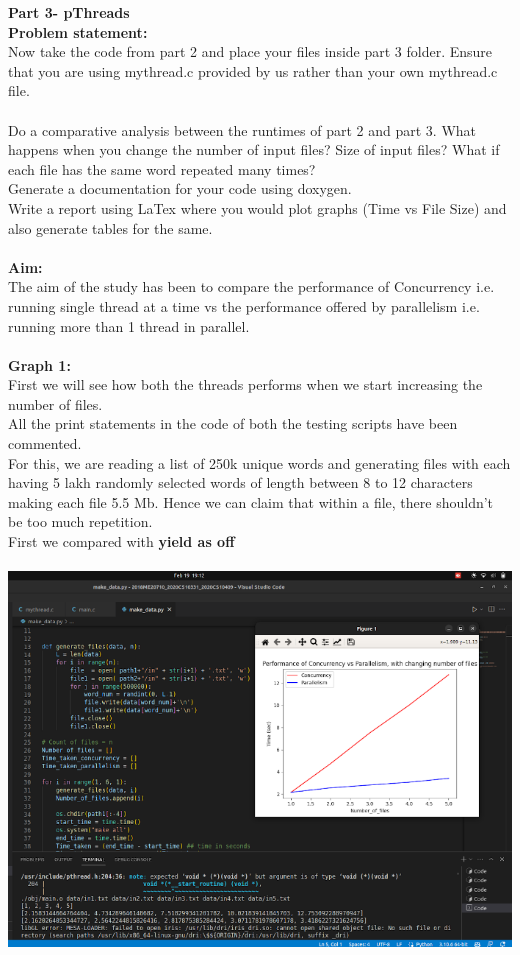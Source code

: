 \documentclass[12pt]{article}
\begin{document}
\begin{spacing}{1.2}
\textbf{Part 3- pThreads} \\
\textbf{Problem statement:} \\
Now take the code from part 2 and place your files inside part 3 folder. Ensure that you are using mythread.c provided by us rather than your own mythread.c file.\\
\\
 Do a comparative analysis between the runtimes of part 2 and part 3. What happens when you change the number of input files? Size of input files? What if each file has the same word repeated many times? \\
 Generate a documentation for your code using doxygen.\\
Write a report using LaTex where you would plot graphs (Time vs File Size) and also generate tables for the same.\\
\\
\textbf{Aim:} \\
The aim of the study has been to compare the performance of Concurrency i.e. running single thread at a time vs the performance offered by parallelism i.e. running more than 1 thread in parallel.\\
\\
\textbf{Graph 1:}\\
First we will see how both the threads performs when we start increasing the number of files.\\
All the print statements in the code of both the testing scripts have been commented.\\
For this, we are reading a list of 250k unique words and generating files with each having 5 lakh randomly selected words of length between 8 to 12 characters making each file 5.5 Mb. Hence we can claim that within a file, there shouldn’t be too much repetition.\\
First we compared with \textbf{yield as off}\\
\\
\includegraphics[width=14cm]{images/30.png}\\

\end{spacing}
\end{document}
